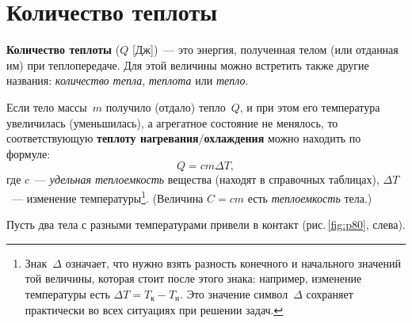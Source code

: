 \documentclass[main.tex]{subfiles}
\begin{document}

\pagestyle{empty}

 

\setcounter{section}{48
}
\addtocounter{section}{-1} 

\section{Количество теплоты}


\textbf{Количество теплоты} ($Q$ [Дж])~--- это энергия, полученная телом (или отданная им) при теплопередаче. Для этой величины можно встретить также другие названия: \emph{количество тепла}, \emph{теплота} или \emph{тепло}.

Если тело массы~$m$ получило (отдало) тепло~$Q$, и при этом его температура увеличилась (уменьшилась), а агрегатное состояние не менялось, то соответствующую \textbf{теплоту нагревания$/$охлаждения} можно находить по формуле:
\begin{equation}
    \label{e22}
    Q=cm\Delta T,
\end{equation}
где $c$~--- \emph{удельная теплоемкость} вещества (находят в справочных таблицах), $\Delta T$~--- изменение температуры\footnote{Знак~$\Delta$ означает, что нужно взять разность конечного и начального значений той величины, которая стоит после этого знака: например, изменение температуры есть $\Delta T=T_\text{к}-T_\text{н}$. Это значение символ~$\Delta$ сохраняет практически во всех ситуациях при решении задач.}. (Величина $C=cm$ есть \emph{теплоемкость} тела.)

Пусть два тела с разными температурами привели в контакт (рис.\,\ref{fig:p80}, слева).
\end{document}
